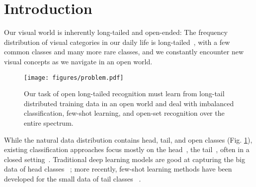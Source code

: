 \documentclass[10pt,twocolumn,letterpaper]{article}
\begin{document}
\section{Introduction}






Our visual world is inherently long-tailed and open-ended: 
The frequency distribution of visual categories in our daily life is long-tailed~\cite{reed2001pareto}, with a few common classes and many more rare classes, and we constantly encounter new visual concepts as we navigate in an open world.

\begin{figure}[t]
  \centering
  \texttt{[image: figures/problem.pdf]}
\caption{Our task of open long-tailed recognition must learn from long-tail distributed training data in an open world and  deal with imbalanced classification, few-shot learning, and open-set recognition over the entire spectrum.}
  \label{fig:intro}
\end{figure}



\begin{table*}[t]
    \centering
    \caption{Comparison between our proposed OLTR task and related existing tasks.} \label{tab:comparison}
\end{table*}








 While the natural data distribution contains head, tail, and open classes (Fig. \ref{fig:intro}), existing classification approaches focus mostly on the
head~\cite{deng2009imagenet, lin2014microsoft}, the tail~\cite{vinyals2016matching, lake2015human}, often in a closed setting~\cite{wang2017learning, miao2018comparison}.  Traditional deep learning  models are good at capturing the big data of head classes ~\cite{krizhevsky2012imagenet, he2016deep}; more recently, few-shot learning methods have been developed for the small data of tail classes ~\cite{snell2017prototypical, hariharan2017low}. 
\end{document}
